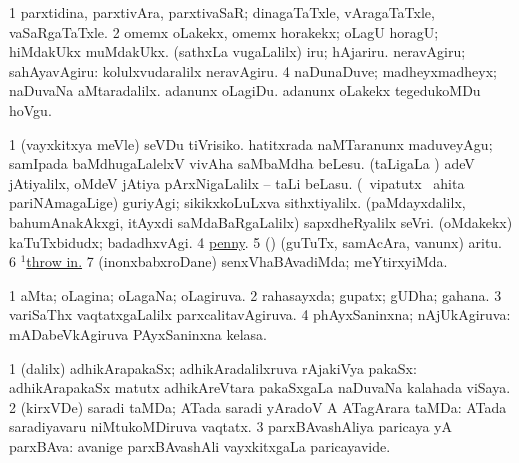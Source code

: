 \noindent
\gl{\pagu}
\bmng
\bnum
\num{1}  parxtidina, parxtivAra, parxtivaSaR; dinagaTaTxle, vAragaTaTxle, vaSaRgaTaTxle. 
\num{2}  omemx oLakekx, omemx horakekx; oLagU horagU; hiMdakUkx muMdakUkx. 
  
\banum
{} (sathxLa \mo vugaLalilx) iru; hAjariru. 
 neravAgiru; sahAyavAgiru:  kolulxvudaralilx neravAgiru. 
\eanum
\numie
\num{4}  naDunaDuve; madheyxmadheyx; naDuvaNa aMtaradalilx. 
  
\banum
{} adanunx oLagiDu. 
 adanunx oLakekx tegedukoMDu hoVgu. 
\eanum
\numie
\enum
\emng

\noindent
\gl{\nuga}
\bmng
{} 
\bnum
\num{1}  (vayxkitxya meVle) seVDu tiVrisiko. 
  
\banum
{} hatitxrada naMTaranunx maduveyAgu; samIpada baMdhugaLalelxV vivAha saMbaMdha beLesu. 
 (taLigaLa \vi) adeV jAtiyalilx, oMdeV jAtiya pArxNigaLalilx -- taLi beLasu. 
\eanum
\numie
{}  
\banum
{} (\sA\ vipatutx \mo\ ahita pariNAmagaLige) guriyAgi; sikikxkoLuLxva sithxtiyalilx. 
 (paMdayxdalilx, bahumAnakAkxgi, itAyxdi saMdaBaRgaLalilx) sapxdheRyalilx seVri. 
 (oMdakekx) kaTuTxbidudx; badadhxvAgi. 
\eanum
\numie
\num{4}  \hyperref{kandict_p.pdf}{P}{penny pagu(6)}{penny}. 
\num{5}  (\AmA) (guTuTx, samAcAra, \mo vanunx) aritu. 
\num{6} \hyperref{kandict_t.pdf}{T}{throw(1) pagu(9)}{$^1$throw in.} 
\num{7}  (inonxbabxroDane) senxVhaBAvadiMda; meYtirxyiMda. 
\enum
\emng
\eentry

\bentry
{}
\gl{\gu}
\bmng
\bnum
\num{1} aMta; oLagina; oLagaNa; oLagiruva. 
\num{2} rahasayxda; gupatx; gUDha; gahana. 
\num{3} variSaThx vaqtatxgaLalilx parxcalitavAgiruva. 
\num{4} phAyxSaninxna; nAjUkAgiruva:  mADabeVkAgiruva PAyxSaninxna kelasa. 
\enum
\emng
\eentry

\bentry
{}
\gl{\nA}
\bmng
\bnum
\num{1} (\bava dalilx) adhikArapakaSx; adhikAradalilxruva rAjakiVya pakaSx:  adhikArapakaSx matutx adhikAreVtara pakaSxgaLa naDuvaNa kalahada viSaya. 
\num{2} (kirxVDe) saradi taMDa; ATada saradi yAradoV A ATagArara taMDa:  ATada saradiyavaru niMtukoMDiruva vaqtatx. 
\num{3} parxBAvashAliya paricaya yA parxBAva:  avanige parxBAvashAli vayxkitxgaLa paricayavide. 
\enum
\emng

